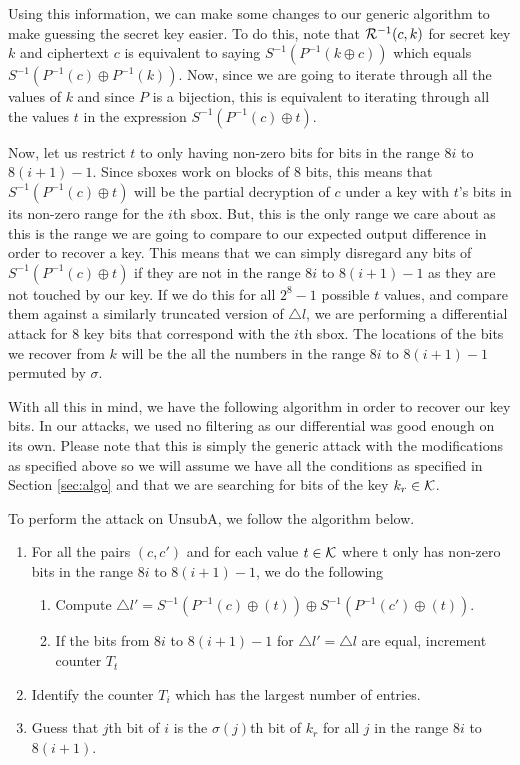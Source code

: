 \documentclass[12pt,a4paper]{article}
\begin{document}
Using this information, we can make some changes to our generic algorithm to
make guessing the secret key easier. To do this, note that ${\cal{R}}^{-1}(c,k)$ for
secret key $k$ and ciphertext $c$ is equivalent to saying $S^{-1}(P^{-1}(k\oplus c))$
which equals $S^{-1}(P^{-1}(c)\oplus P^{-1}(k))$. Now, since we are going to
iterate through all the values of $k$ and since $P$ is a bijection, this is
equivalent to iterating through all the values $t$ in the expression
$S^{-1}(P^{-1}(c) \oplus t)$. 

Now, let us restrict $t$ to only having non-zero bits for bits in the range $8i$ to
$8(i+1)-1$.
Since sboxes work on blocks of $8$ bits, this means that $S^{-1}(P^{-1}(c)
\oplus t)$ will be the partial decryption of $c$ under a key with $t$'s bits in
its non-zero range for the $i$th sbox. But, this is the only range we care
about as this is the range we are going to compare to our expected output
difference in order to recover a key. This means that we can simply disregard
any bits of $S^{-1}(P^{-1}(c) \oplus t)$ if they are not in the range $8i$ to
$8(i+1)-1$ as they are not touched by our key. If we do this for all $2^8-1$
possible
$t$ values, and compare them against a similarly truncated version of $\triangle l$,
we are performing a differential attack for 8 key bits that correspond with the
$i$th sbox. The locations of the bits we recover from $k$ will be the all the
numbers in the range $8i$ to $8(i+1)-1$ permuted by $\sigma$.

With all this in mind, we have the following algorithm in order to recover our
key bits. In our attacks, we used no filtering as our differential was good
enough on its own. Please note that this is simply the generic attack with the
modifications as specified above so we will assume we have all the conditions
as specified in Section \ref{sec:algo} and that we are searching for bits of
the key $k_r \in \cal{K}$.
\newpage
\begin{shadedbox}
To perform the attack on UnsubA, we follow the algorithm below.
\begin{enumerate}
    \item For all the pairs $(c,c')$ and for each value $t \in
    \cal{K}$ where t only has non-zero bits in the range $8i$ to $8(i+1)-1$, we do the following
        \begin{enumerate}
            \item Compute $\triangle l' = S^{-1}(P^{-1}(c)\oplus(t)) \oplus
            S^{-1}(P^{-1}(c')\oplus(t))$.
            \item If the bits from $8i$ to $8(i+1)-1$ for $\triangle l' =
            \triangle l$ are equal, increment counter $T_t$
        \end{enumerate}
    \item Identify the counter $T_i$ which has the largest number of entries.
    \item Guess that $j$th bit of $i$ is the $\sigma(j)$th bit of $k_r$ for all
    $j$ in the range $8i$ to $8(i+1)$.
\end{enumerate}
\end{shadedbox}
\end{document}
